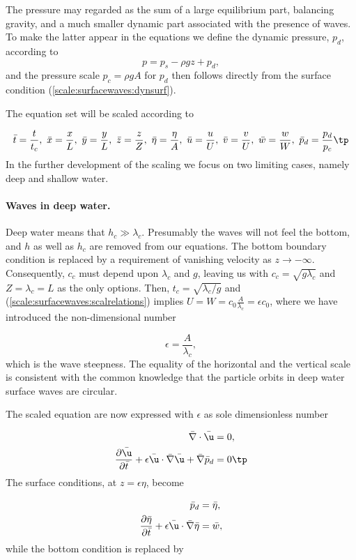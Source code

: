 \documentclass[graybox,envcountchap,sectrefs,final]{svmonodo}
\begin{document}
The pressure may regarded as the sum of a large equilibrium part, balancing
gravity, and a much smaller dynamic part associated with the presence of
waves. To make the latter appear in the equations we define the
dynamic pressure, $p_d$, according to
\[ p=p_s-\rho g z +p_d,\]
and the pressure scale $p_c=\rho g A$ for $p_d$ then follows directly from
the surface condition (\ref{scale:surfacewaves:dynsurf}).

The equation set will be scaled according to

\[
\bar t=\frac{t}{t_c},\ \bar x=\frac{x}{L},\ \bar y =\frac{y}{L},\ \bar z =\frac{z}{Z},\ \bar \eta=\frac{\eta}{A},\ \bar u=\frac{u}{U},\ \bar v=\frac{v}{U},\ \bar w=\frac{w}{W},\ \bar p_d=\frac{p_d}{p_c}\tp
\]
In the further development of the scaling
we focus on two limiting cases, namely deep and shallow water.

\paragraph{Waves in deep  water.}
Deep water means that $h_c\gg\lambda_c$. Presumably the waves will not
feel the bottom, and $h$ as well as $h_c$ are removed from our
equations. The bottom boundary condition is replaced by a requirement
of vanishing velocity as $z\rightarrow -\infty$. Consequently, $c_c$
must depend upon $\lambda_c$ and $g$, leaving us with
$c_c=\sqrt{g\lambda_c}$ and $Z=\lambda_c=L$ as the only options.
Then, $t_c=\sqrt{\lambda_c/g}$ and
(\ref{scale:surfacewaves:scalrelations}) implies
$U=W=c_0\frac{A}{\lambda_c}=\epsilon c_0$, where we have introduced
the non-dimensional number

\[\epsilon=\frac{A}{\lambda_c},\]
which is the wave steepness. The equality of the horizontal and the vertical
scale is consistent with the common knowledge that the particle orbits in
deep water surface waves are circular.

The scaled equation are now expressed with $\epsilon$ as sole dimensionless
number

\begin{align}
\bar \nabla\cdot\bar\u &=0,
\label{scale:surfacewaves:cont:}\\ 
\frac{\partial\bar\u}{\partial \bar t} + \epsilon\bar \u\cdot\bar\nabla\bar\u + \bar\nabla \bar p_d&=0\tp
\label{scale:surfacewave:u:s}
\end{align}
The surface conditions, at $z=\epsilon \eta$, become

\begin{align}
\bar p_d &=\bar \eta,
\label{scale:surfacewaves:dynsurf:s}\\ 
\frac{\partial\bar\eta}{\partial \bar t} + \epsilon \bar \u\cdot\bar\nabla\bar\eta &=\bar w,
\label{scale:surfacewave:kinsurf:s}
\end{align}
while the bottom condition is replaced by
\end{document}
